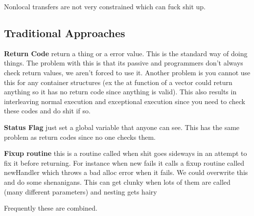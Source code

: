 \documentclass{article}
\begin{document}
Nonlocal transfers are not very constrained which can fuck shit up.

\subsection{Traditional Approaches}
\textbf{Return Code} return a thing or a error value. This is the standard way of doing things. The problem with this is that its passive and programmers don't always check return values, we aren't forced to use it. Another problem is you cannot use this for any container structures (ex the at function of a vector could return anything so it has no return code since anything is valid). This also results in interleaving normal execution and exceptional execution since you need to check these codes and do shit if so.

\textbf{Status Flag} just set a global variable that anyone can see. This has the same problem as return codes since no one checks them.

\textbf{Fixup routine} this is a routine called when shit goes sideways in an attempt to fix it before returning. For instance when new fails it calls a fixup routine called newHandler which throws a bad alloc error when it fails. We could overwrite this and do some shenanigans. This can get clunky when lots of them are called (many different parameters) and nesting gets hairy

Frequently these are combined.
\end{document}
